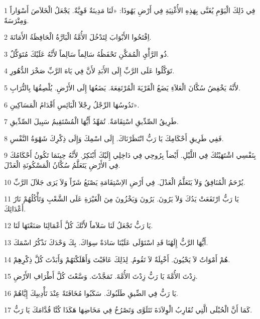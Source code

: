 \par 1 فِي ذَلِكَ الْيَوْمِ يُغَنَّى بِهَذِهِ الأُغْنِيَةِ فِي أَرْضِ يَهُوذَا: «لَنَا مَدِينَةٌ قَوِيَّةٌ. يَجْعَلُ الْخَلاَصَ أَسْوَاراً وَمِتْرَسَةً.
\par 2 اِفْتَحُوا الأَبْوَابَ لِتَدْخُلَ الأُمَّةُ الْبَارَّةُ الْحَافِظَةُ الأَمَانَةَ.
\par 3 ذُو الرَّأْيِ الْمُمَكَّنِ تَحْفَظُهُ سَالِماً سَالِماً لأَنَّهُ عَلَيْكَ مُتَوَكِّلٌ.
\par 4 تَوَكَّلُوا عَلَى الرَّبِّ إِلَى الأَبَدِ لأَنَّ فِي يَاهَ الرَّبِّ صَخْرَ الدُّهُورِ.
\par 5 لأَنَّهُ يَخْفِضُ سُكَّانَ الْعَلاَءِ يَضَعُ الْقَرْيَةَ الْمُرْتَفِعَةَ. يَضَعُهَا إِلَى الأَرْضِ. يُلْصِقُهَا بِالتُّرَابِ.
\par 6 تَدُوسُهَا الرِّجْلُ رِجْلاَ الْبَائِسِ أَقْدَامُ الْمَسَاكِينِ».
\par 7 طَرِيقُ الصِّدِّيقِ اسْتِقَامَةٌ. تُمَهِّدُ أَيُّهَا الْمُسْتَقِيمُ سَبِيلَ الصِّدِّيقِ.
\par 8 فَفِي طَرِيقِ أَحْكَامِكَ يَا رَبُّ انْتَظَرْنَاكَ. إِلَى اسْمِكَ وَإِلَى ذِكْرِكَ شَهْوَةُ النَّفْسِ.
\par 9 بِنَفْسِي اشْتَهَيْتُكَ فِي اللَّيْلِ. أَيْضاً بِرُوحِي فِي دَاخِلِي إِلَيْكَ أَبْتَكِرُ. لأَنَّهُ حِينَمَا تَكُونُ أَحْكَامُكَ فِي الأَرْضِ يَتَعَلَّمُ سُكَّانُ الْمَسْكُونَةِ الْعَدْلَ.
\par 10 يُرْحَمُ الْمُنَافِقُ وَلاَ يَتَعَلَّمُ الْعَدْلَ. فِي أَرْضِ الاِسْتِقَامَةِ يَصْنَعُ شَرّاً وَلاَ يَرَى جَلاَلَ الرَّبِّ.
\par 11 يَا رَبُّ ارْتَفَعَتْ يَدُكَ وَلاَ يَرُونَ. يَرُونَ وَيَخْزُونَ مِنَ الْغَيْرَةِ عَلَى الشَّعْبِ وَتَأْكُلُهُمْ نَارُ أَعْدَائِكَ.
\par 12 يَا رَبُّ تَجْعَلُ لَنَا سَلاَماً لأَنَّكَ كُلَّ أَعْمَالِنَا صَنَعْتَهَا لَنَا.
\par 13 أَيُّهَا الرَّبُّ إِلَهُنَا قَدِ اسْتَوْلَى عَلَيْنَا سَادَةٌ سِوَاكَ. بِكَ وَحْدَكَ نَذْكُرُ اسْمَكَ.
\par 14 هُمْ أَمْوَاتٌ لاَ يَحْيُونَ. أَخْيِلَةٌ لاَ تَقُومُ. لِذَلِكَ عَاقَبْتَ وَأَهْلَكْتَهُمْ وَأَبَدْتَ كُلَّ ذِكْرِهِمْ.
\par 15 زِدْتَ الأُمَّةَ يَا رَبُّ زِدْتَ الأُمَّةَ. تَمَجَّدْتَ. وَسَّعْتَ كُلَّ أَطْرَافِ الأَرْضِ.
\par 16 يَا رَبُّ فِي الضِّيقِ طَلَبُوكَ. سَكَبُوا مُخَافَتَةً عِنْدَ تَأْدِيبِكَ إِيَّاهُمْ.
\par 17 كَمَا أَنَّ الْحُبْلَى الَّتِي تُقَارِبُ الْوِلاَدَةَ تَتَلَوَّى وَتَصْرُخُ فِي مَخَاضِهَا هَكَذَا كُنَّا قُدَّامَكَ يَا رَبُّ.
